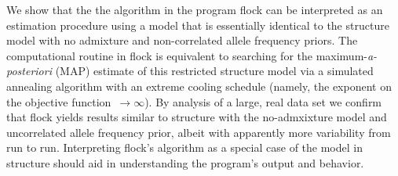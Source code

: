 
      We show that the the algorithm in the program {\sc flock} \citep{Duc&Tur2009} can be
interpreted as an estimation procedure using  
a model that is essentially identical to the {\sc structure} 
\citep{Pritchardetal2000} model with no admixture and non-correlated 
allele frequency priors. The computational routine in {\sc flock} is 
equivalent to searching for the maximum-{\em a-posteriori} (MAP) 
estimate of this restricted {\sc structure} model via a simulated 
annealing algorithm with an extreme cooling 
schedule (namely, the exponent on the objective function~$\rightarrow \infty$).  By analysis of a large, real data set we
confirm that {\sc flock} yields results similar to {\sc structure} with the no-admxixture
model and uncorrelated allele frequency prior, albeit with apparently more variability 
from run to run. Interpreting {\sc flock}'s algorithm as a special case of the model in 
{\sc structure} should aid in  understanding the program's output and behavior. 

